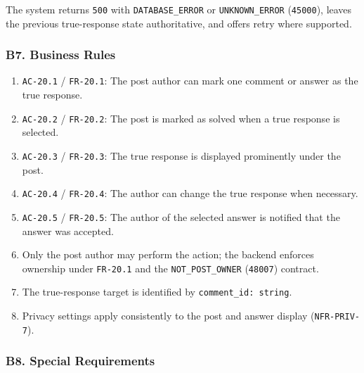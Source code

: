 \documentclass[12pt]{article}
\begin{document}
The system returns \texttt{500} with \texttt{DATABASE\_ERROR} or \texttt{UNKNOWN\_ERROR} (\texttt{45000}), leaves the previous true-response state authoritative, and offers retry where supported.
\par\medskip

\hypertarget{sec:b7-business-rules}{}
\subsubsection*{B7. Business Rules}
\par\medskip

\begin{enumerate}
\item \texttt{AC-20.1} / \texttt{FR-20.1}: The post author can mark one comment or answer as the true response.
\item \texttt{AC-20.2} / \texttt{FR-20.2}: The post is marked as solved when a true response is selected.
\item \texttt{AC-20.3} / \texttt{FR-20.3}: The true response is displayed prominently under the post.
\item \texttt{AC-20.4} / \texttt{FR-20.4}: The author can change the true response when necessary.
\item \texttt{AC-20.5} / \texttt{FR-20.5}: The author of the selected answer is notified that the answer was accepted.
\item Only the post author may perform the action; the backend enforces ownership under \texttt{FR-20.1} and the \texttt{NOT\_POST\_OWNER} (\texttt{48007}) contract.
\item The true-response target is identified by \texttt{comment\_id: string}.
\item Privacy settings apply consistently to the post and answer display (\texttt{NFR-PRIV-7}).
\end{enumerate}
\par\medskip

\hypertarget{sec:b8-special-requirements}{}
\subsubsection*{B8. Special Requirements}
\par\medskip
\end{document}
